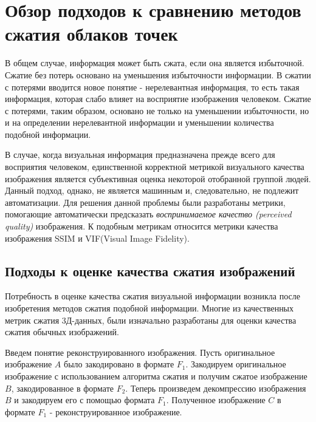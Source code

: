\chapter{Обзор подходов к сравнению методов сжатия облаков точек}


В общем случае, информация может быть сжата, если она является избыточной.
Сжатие без потерь основано на уменьшения избыточности информации. В сжатии с
потерями вводится новое понятие - нерелевантная информация, то есть такая
информация, которая слабо влияет на восприятие изображения человеком. Сжатие с
потерями, таким образом, основано не только на уменьшении избыточности, но и на
определении нерелевантной информации и уменьшении количества подобной
информации\cite[265]{DataCompression}.

В случае, когда визуальная информация предназначена прежде всего для восприятия
человеком, единственной корректной метрикой визуального качества изображения
является субъективная оценка некоторой отобранной группой
людей\cite{SSIMArticle}. Данный подход, однако, не является машинным и,
следовательно, не подлежит автоматизации. Для решения данной проблемы были
разработаны метрики, помогающие автоматически предсказать \textit{воспринимаемое
качество (perceived quality)} изображения. К подобным метрикам относится метрики
качества изображения SSIM и VIF(Visual Image Fidelity).

\section{Подходы к оценке качества сжатия изображений}


Потребность в оценке качества сжатия визуальной информации возникла после
изобретения методов сжатия подобной информации. Многие из качественных метрик
сжатия 3Д-данных, были изначально разработаны для оценки качества сжатия обычных
изображений.

Введем понятие реконструированного изображения. Пусть оригинальное изображение
$A$ было закодировано в формате $F_{1}$. Закодируем оригинальное изображение с
использованием алгоритма сжатия и получим сжатое изображение $B$, закодированное
в формате $F_{2}$. Теперь произведем декомпрессию изображения $B$ и закодируем
его с помощью формата $F_{1}$. Полученное изображение $C$ в формате $F_{1}$ -
реконструированное изображение.

